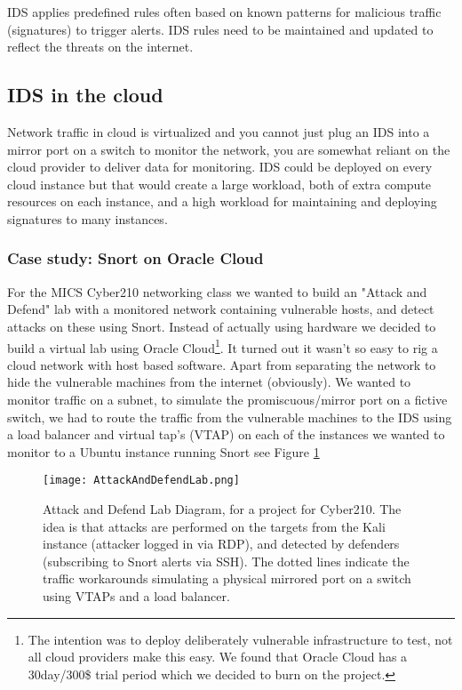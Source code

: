 \documentclass[
	letterpaper, %
	10pt, %
	unnumberedsections, %
	twoside, %
]{APAAssignment}
\begin{document}
IDS applies predefined rules often based on known patterns for malicious traffic (signatures) to trigger alerts. IDS rules need to be maintained and updated to reflect the threats on the internet.    

\subsection{IDS in the cloud}
Network traffic in cloud is virtualized and you cannot just plug an IDS into a mirror port on a switch to monitor the network, you are somewhat reliant on the cloud provider to deliver data for monitoring. IDS could be deployed on every cloud instance but that would create a large workload, both of extra compute resources on each instance, and a high workload for maintaining and deploying signatures to many instances.       

\subsubsection{Case study: Snort on Oracle Cloud}
For the MICS Cyber210 networking class we wanted to build an "Attack and Defend" lab with a monitored network containing vulnerable hosts, and detect attacks on these using Snort\cite{SNORT}. Instead of actually using hardware we decided to build a virtual lab using Oracle Cloud\footnote{The intention was to deploy deliberately
vulnerable infrastructure to test, not all cloud providers make this easy. We found that Oracle Cloud has a 30day/300\$ trial period which we decided to burn on the project.}. It turned out it wasn't so easy to rig a cloud network with host based software. Apart from separating the network to hide the vulnerable machines from the internet (obviously). We wanted to monitor traffic on a subnet, to simulate the promiscuous/mirror port on a fictive switch, we had to route the traffic from the vulnerable machines to the IDS using a load balancer and virtual tap's (VTAP) on each of the instances we wanted to monitor to a Ubuntu instance running Snort see Figure \ref{fig:AttackAndDefendLab} 

\begin{figure}[!htp] %
	\centering
	\texttt{[image: AttackAndDefendLab.png]}
	\caption{Attack and Defend Lab Diagram, for a project for Cyber210. The idea is that attacks are performed on the targets from the Kali instance (attacker logged in via RDP), and detected by defenders (subscribing to Snort alerts via SSH). The dotted lines indicate the traffic workarounds simulating a physical mirrored port on a switch using VTAPs and a load balancer.}
	\label{fig:AttackAndDefendLab}
\end{figure}
\end{document}
